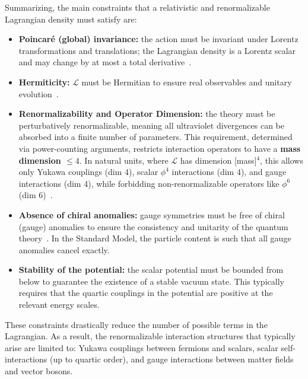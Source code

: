 Summarizing, the main constraints that a relativistic and renormalizable Lagrangian density must satisfy are:
\begin{itemize}
	\item \textbf{Poincaré (global) invariance:} the action must be invariant under Lorentz transformations and translations; the Lagrangian density is a Lorentz scalar and may change by at most a total derivative~\parencite{pall,jose1998classical}. 
	\item \textbf{Hermiticity:} $\mathcal{L}$ must be Hermitian to ensure real observables and unitary evolution~\parencite{pall,peskin}.
	\item \textbf{Renormalizability and Operator Dimension:} the theory must be perturbatively renormalizable, meaning all ultraviolet divergences can be absorbed into a finite number of parameters. This requirement, determined via power-counting arguments, restricts interaction operators to have a \textbf{mass dimension $\leq 4$}. In natural units, where $\mathcal{L}$ has dimension [mass]$^4$, this allows only Yukawa couplings (dim 4), scalar $\phi^4$ interactions (dim 4), and gauge interactions (dim 4), while forbidding non-renormalizable operators like $\phi^6$ (dim 6)~\parencite{peskin,Weinberg}.
	\item \textbf{Absence of chiral anomalies:} gauge symmetries must be free of chiral (gauge) anomalies to ensure the consistency and unitarity of the quantum theory~\parencite{peskin,Weinberg,bertlmann1996anomalies}. In the Standard Model, the particle content is such that all gauge anomalies cancel exactly.
	\item \textbf{Stability of the potential:} the scalar potential must be bounded from below to guarantee the existence of a stable vacuum state. This typically requires that the quartic couplings in the potential are positive at the relevant energy scales.
\end{itemize}

These constraints drastically reduce the number of possible terms in the Lagrangian. As a result, the renormalizable interaction structures that typically arise are limited to: Yukawa couplings between fermions and scalars, scalar self-interactions (up to quartic order), and gauge interactions between matter fields and vector bosons.

